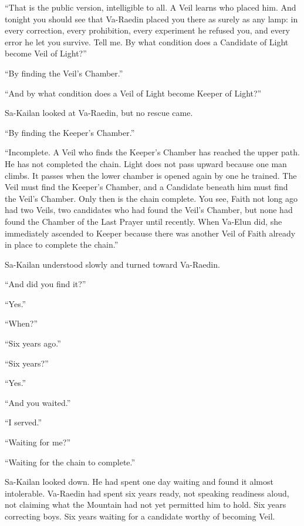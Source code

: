 “That is the public version, intelligible to all.
A Veil learns who placed him.
And tonight you should see that Va-Raedin placed you there as surely as any lamp:
in every correction, every prohibition, every experiment he refused you, and every error he let you survive.
Tell me.
By what condition does a Candidate of Light become Veil of Light?”\par

“By finding the Veil’s Chamber.”\par
“And by what condition does a Veil of Light become Keeper of Light?”\par
Sa-Kailan looked at Va-Raedin, but no rescue came.\par
“By finding the Keeper’s Chamber.”\par

“Incomplete.
A Veil who finds the Keeper’s Chamber has reached the upper path.
He has not completed the chain.
Light does not pass upward because one man climbs.
It passes when the lower chamber is opened again by one he trained.
The Veil must find the Keeper’s Chamber, and a Candidate beneath him must find the Veil’s Chamber.
Only then is the chain complete.
You see, Faith not long ago had two Veils, two candidates who had found the Veil's Chamber, but none had found the Chamber of the Last Prayer until recently.
When Va-Elun did, she immediately ascended to Keeper because there was another Veil of Faith already in place to complete the chain.”\par




Sa-Kailan understood slowly and turned toward Va-Raedin.\par

“And did you find it?”\par
“Yes.”\par
“When?”\par
“Six years ago.”\par
“Six years?”\par
“Yes.”\par
“And you waited.”\par
“I served.”\par
“Waiting for me?”\par
“Waiting for the chain to complete.”\par

Sa-Kailan looked down.
He had spent one day waiting and found it almost intolerable.
Va-Raedin had spent six years ready, not speaking readiness aloud, not claiming what the Mountain had not yet permitted him to hold.
Six years correcting boys.
Six years waiting for a candidate worthy of becoming Veil.\par

